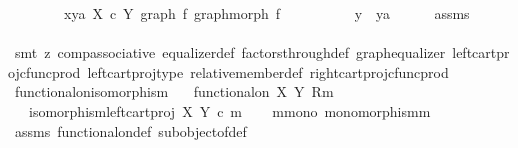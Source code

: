 \begin{isabellebody}
\ \ \ \ \ \ \ \ {\isasymlangle}x{\isacharcomma}{\kern0pt}ya{\isasymrangle}\ {\isasymin}\isactrlbsub X\ {\isasymtimes}\isactrlsub c\ Y\isactrlesub \ {\isacharparenleft}{\kern0pt}graph\ f{\isacharcomma}{\kern0pt}\ graph{\isacharunderscore}{\kern0pt}morph\ f{\isacharparenright}{\kern0pt}\isanewline
\ \ \ \ \ \ \ \ \ {\isasymLongrightarrow}\ y\ {\isacharequal}{\kern0pt}\ ya{\isachardoublequoteclose}\isanewline
\ \ \ \ \isamarkupfalse%
\ assms\ \ \isanewline
\ \ \ \ \isamarkupfalse%
\ {\isacharparenleft}{\kern0pt}smt\ {\isacharparenleft}{\kern0pt}z{}{\isacharparenright}{\kern0pt}\ comp{\isacharunderscore}{\kern0pt}associative{}\ equalizer{\isacharunderscore}{\kern0pt}def\ factors{\isacharunderscore}{\kern0pt}through{\isacharunderscore}{\kern0pt}def{}\ graph{\isacharunderscore}{\kern0pt}equalizer{}\ left{\isacharunderscore}{\kern0pt}cart{\isacharunderscore}{\kern0pt}proj{\isacharunderscore}{\kern0pt}cfunc{\isacharunderscore}{\kern0pt}prod\ left{\isacharunderscore}{\kern0pt}cart{\isacharunderscore}{\kern0pt}proj{\isacharunderscore}{\kern0pt}type\ relative{\isacharunderscore}{\kern0pt}member{\isacharunderscore}{\kern0pt}def{}\ right{\isacharunderscore}{\kern0pt}cart{\isacharunderscore}{\kern0pt}proj{\isacharunderscore}{\kern0pt}cfunc{\isacharunderscore}{\kern0pt}prod{\isacharparenright}{\kern0pt}\isanewline
{}\isamarkupfalse%
%
\endisatagproof
{\isafoldproof}%
%
\isadelimproof
\isanewline
%
\endisadelimproof
\isanewline
{}\isamarkupfalse%
\ functional{\isacharunderscore}{\kern0pt}on{\isacharunderscore}{\kern0pt}isomorphism{\isacharcolon}{\kern0pt}\isanewline
\ \ \ {\isachardoublequoteopen}functional{\isacharunderscore}{\kern0pt}on\ X\ Y\ {\isacharparenleft}{\kern0pt}R{\isacharcomma}{\kern0pt}m{\isacharparenright}{\kern0pt}{\isachardoublequoteclose}\isanewline
\ \ \ {\isachardoublequoteopen}isomorphism{\isacharparenleft}{\kern0pt}left{\isacharunderscore}{\kern0pt}cart{\isacharunderscore}{\kern0pt}proj\ X\ Y\ {\isasymcirc}\isactrlsub c\ m{\isacharparenright}{\kern0pt}{\isachardoublequoteclose}\isanewline
%
\isadelimproof
%
\endisadelimproof
%
\isatagproof
{}\isamarkupfalse%
{\isacharminus}{\kern0pt}\isanewline
\ \ \isamarkupfalse%
\ m{\isacharunderscore}{\kern0pt}mono{\isacharcolon}{\kern0pt}\ {\isachardoublequoteopen}monomorphism{\isacharparenleft}{\kern0pt}m{\isacharparenright}{\kern0pt}{\isachardoublequoteclose}\isanewline
\ \ \ \ \isamarkupfalse%
\ assms\ functional{\isacharunderscore}{\kern0pt}on{\isacharunderscore}{\kern0pt}def\ subobject{\isacharunderscore}{\kern0pt}of{\isacharunderscore}{\kern0pt}def{}\ \isamarkupfalse%

\end{isabellebody}
